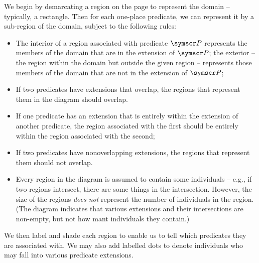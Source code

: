 We begin by demarcating a region on the page to represent the domain – typically, a rectangle. Then for each one-place predicate, we can represent it by a sub-region of the domain, subject to the following rules: \begin{itemize}
\item The interior of a region associated with predicate $\meta{P}$ represents the members of the domain that are in the extension of $\meta{P}$; the exterior – the region within the domain but outside the given region – represents those members of the domain that are not in the extension of $\meta{P}$;
	\item If two predicates have extensions that overlap, the regions that represent them in the diagram should overlap.
	\item If one predicate has an extension that is entirely within the extension of another predicate, the region associated with the first should be entirely within the region associated with the second;
	\item If two predicates have nonoverlapping extensions, the regions that represent them should not overlap.
	\item Every region in the diagram is assumed to contain some individuals – e.g., if two regions intersect, there are some things in the intersection. However, the size of the regions \emph{does not} represent the number of individuals in the region. (The diagram indicates that various extensions and their intersections are non-empty, but not how mant individuals they contain.) 
\end{itemize} We then label and shade each region to enable us to tell which predicates they are associated with. We may also add labelled dots to denote individuals who may fall into various predicate extensions.

